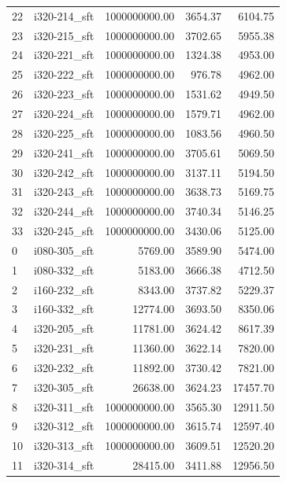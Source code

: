 \begin{tabular}{llrrr}
22 &  i320-214\_sft & 1000000000.00 &           3654.37 &     6104.75 \\
23 &  i320-215\_sft & 1000000000.00 &           3702.65 &     5955.38 \\
24 &  i320-221\_sft & 1000000000.00 &           1324.38 &     4953.00 \\
25 &  i320-222\_sft & 1000000000.00 &            976.78 &     4962.00 \\
26 &  i320-223\_sft & 1000000000.00 &           1531.62 &     4949.50 \\
27 &  i320-224\_sft & 1000000000.00 &           1579.71 &     4962.00 \\
28 &  i320-225\_sft & 1000000000.00 &           1083.56 &     4960.50 \\
29 &  i320-241\_sft & 1000000000.00 &           3705.61 &     5069.50 \\
30 &  i320-242\_sft & 1000000000.00 &           3137.11 &     5194.50 \\
31 &  i320-243\_sft & 1000000000.00 &           3638.73 &     5169.75 \\
32 &  i320-244\_sft & 1000000000.00 &           3740.34 &     5146.25 \\
33 &  i320-245\_sft & 1000000000.00 &           3430.06 &     5125.00 \\
0  &  i080-305\_sft &       5769.00 &           3589.90 &     5474.00 \\
1  &  i080-332\_sft &       5183.00 &           3666.38 &     4712.50 \\
2  &  i160-232\_sft &       8343.00 &           3737.82 &     5229.37 \\
3  &  i160-332\_sft &      12774.00 &           3693.50 &     8350.06 \\
4  &  i320-205\_sft &      11781.00 &           3624.42 &     8617.39 \\
5  &  i320-231\_sft &      11360.00 &           3622.14 &     7820.00 \\
6  &  i320-232\_sft &      11892.00 &           3730.42 &     7821.00 \\
7  &  i320-305\_sft &      26638.00 &           3624.23 &    17457.70 \\
8  &  i320-311\_sft & 1000000000.00 &           3565.30 &    12911.50 \\
9  &  i320-312\_sft & 1000000000.00 &           3615.74 &    12597.40 \\
10 &  i320-313\_sft & 1000000000.00 &           3609.51 &    12520.20 \\
11 &  i320-314\_sft &      28415.00 &           3411.88 &    12956.50 \\

\end{tabular}
